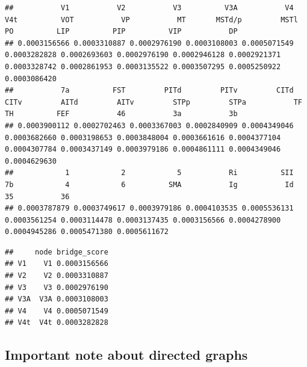 \documentclass[
]{book}
\newenvironment{Shaded}{\begin{snugshade}}{\end{snugshade}}
\newcommand{\AttributeTok}[1]{\textcolor[rgb]{0.13,0.29,0.53}{#1}}
\newcommand{\FunctionTok}[1]{\textcolor[rgb]{0.13,0.29,0.53}{\textbf{#1}}}
\newcommand{\NormalTok}[1]{#1}
\newcommand{\OtherTok}[1]{\textcolor[rgb]{0.56,0.35,0.01}{#1}}
\newcommand{\SpecialCharTok}[1]{\textcolor[rgb]{0.81,0.36,0.00}{\textbf{#1}}}
\begin{document}
\begin{verbatim}
##           V1           V2           V3          V3A           V4          V4t          VOT           VP           MT       MSTd/p         MSTl           PO          LIP          PIP          VIP           DP 
## 0.0003156566 0.0003310887 0.0002976190 0.0003108003 0.0005071549 0.0003282828 0.0002693603 0.0002976190 0.0002946128 0.0002921371 0.0003328742 0.0002861953 0.0003135522 0.0003507295 0.0005250922 0.0003086420 
##           7a          FST         PITd         PITv         CITd         CITv         AITd         AITv         STPp         STPa           TF           TH          FEF           46           3a           3b 
## 0.0003900112 0.0002702463 0.0003367003 0.0002840909 0.0004349046 0.0003682660 0.0003198653 0.0003848004 0.0003661616 0.0004377104 0.0004307784 0.0003437149 0.0003979186 0.0004861111 0.0004349046 0.0004629630 
##            1            2            5           Ri          SII           7b            4            6          SMA           Ig           Id           35           36 
## 0.0003787879 0.0003749617 0.0003979186 0.0004103535 0.0005536131 0.0003561254 0.0003114478 0.0003137435 0.0003156566 0.0004278900 0.0004945286 0.0005471380 0.0005611672
\end{verbatim}

\begin{Shaded}
\end{Shaded}

\begin{verbatim}
##     node bridge_score
## V1    V1 0.0003156566
## V2    V2 0.0003310887
## V3    V3 0.0002976190
## V3A  V3A 0.0003108003
## V4    V4 0.0005071549
## V4t  V4t 0.0003282828
\end{verbatim}

\subsection{Important note about directed graphs}\label{important-note-about-directed-graphs}
\end{document}
